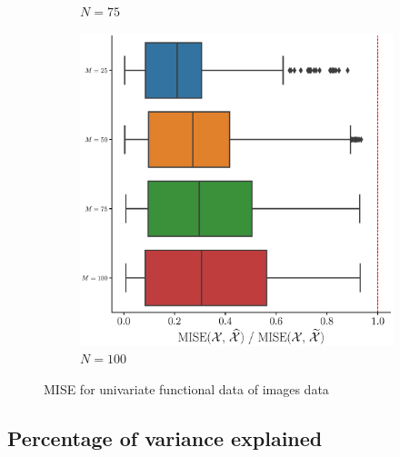 \begin{results}
\begin{figure}
\begin{subfigure}[b]{0.49\textwidth}
         \caption{$N = 75$}
         \label{fig:mise_mfd_2d_75}
     \end{subfigure}
     \begin{subfigure}[b]{0.49\textwidth}
         \centering
         \includegraphics[width=\textwidth]{figures/scenario_2/mise_N100.eps}
         \caption{$N = 100$}
         \label{fig:mise_mfd_2d_100}
    \end{subfigure}
    \caption{MISE for univariate functional data of images data}
    \label{fig:mise_mfd_2d}
\end{figure}

\end{results}



\subsection{Percentage of variance explained} %
\label{sub:percentage_of_variance_explained_simulation}

